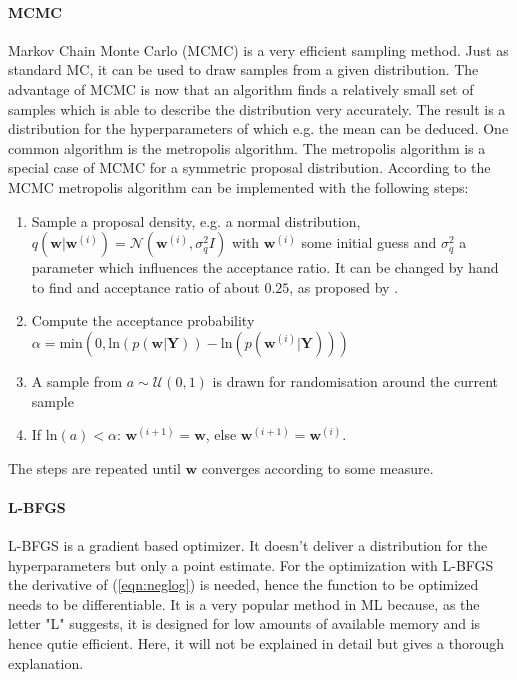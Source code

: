 \documentclass[%
  a4paper,oneside,%
  11pt,%
  smallchapters,
  style=printdev,
  extramargin,
  green,%
  rgb, <cmyk>
  ]{tubsbook}
\begin{document}
\paragraph{MCMC}
Markov Chain Monte Carlo (MCMC) is a very efficient sampling method. Just as standard MC, it can be used to draw samples from a given distribution. The advantage of MCMC is now that an algorithm finds a relatively small set of samples which is able to describe the distribution very accurately. The result is a distribution for the hyperparameters of which e.g. the mean can be deduced. One common algorithm is the metropolis algorithm.
The metropolis algorithm is a special case of MCMC for a symmetric proposal distribution.
According to \cite[p.31]{girolami2021} the MCMC metropolis algorithm can be implemented with the following steps:
\begin{enumerate}
\item Sample a proposal density, e.g. a normal distribution, $q(\bm{w}|\bm{w}^{(i)}) = \mathcal{N}(\bm{w}^{(i)},\sigma^2_q I)$ with $\bm{w}^{(i)}$ some initial guess and $\sigma^2_q$ a parameter which influences the acceptance ratio. It can be changed by hand to find and acceptance ratio of about $0.25$, as proposed by \cite{girolami2021}.
\item Compute the acceptance probability $\alpha = \mathrm{min}(0,\mathrm{ln}(p(\bm{w}|\bm{Y}))  - \mathrm{ln}(p(\bm{w}^{(i)}|\bm{Y})))$

\item A sample from $a \sim \mathcal{U}(0,1)$ is drawn for randomisation around the current sample
\item If $\mathrm{ln}(a)<\alpha$: $\bm{w}^{(i+1)} = \bm{w}$, else $\bm{w}^{(i+1)} = \bm{w}^{(i)}$. 
\end{enumerate}
The steps are repeated until $\bm{w}$ converges according to some measure.



\paragraph{L-BFGS}
L-BFGS is a gradient based optimizer. It doesn't deliver a distribution for the hyperparameters but only a point estimate.
For the optimization with L-BFGS the derivative of (\ref{eqn:neglog}) is needed, hence the function to be optimized needs to be differentiable. It is a very popular method in ML because, as the letter "L" suggests, it is designed for low amounts of available memory and is hence qutie efficient. Here, it will not be explained in detail but \cite{Zhu1997} gives a thorough explanation. 
\end{document}
